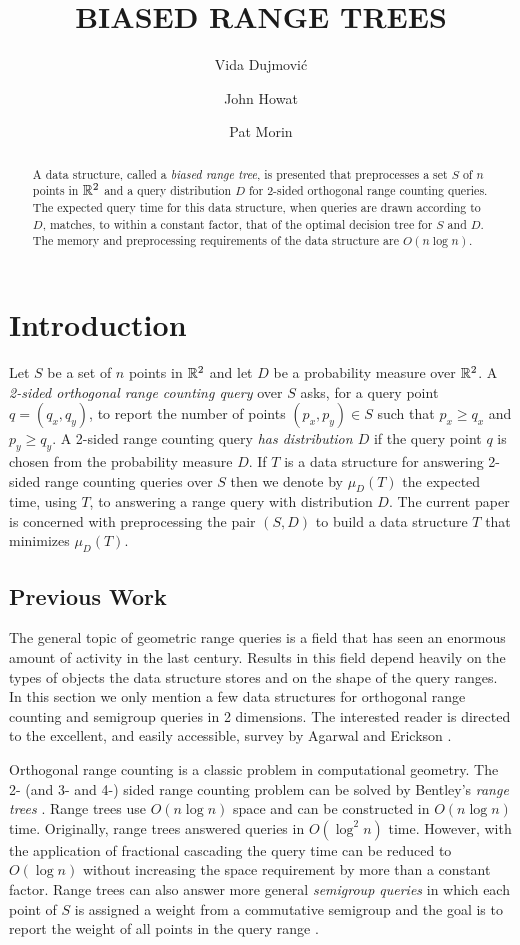\documentclass[lotsofwhite,charterfonts]{patmorin}
\title{\MakeUppercase{Biased Range Trees}}
\author{Vida Dujmovi\'c
	\and John Howat
	\and Pat Morin}
\begin{document}
\maketitle
\begin{abstract}
A data structure, called a \emph{biased range tree}, is presented that
preprocesses a set $S$ of $n$ points in $\mathbb{R}^2$ and a query
distribution $D$ for 2-sided orthogonal range counting queries.  The
expected query time for this data structure, when queries are drawn
according to $D$, matches, to within a constant factor, that of the
optimal decision tree for $S$ and $D$.   The memory and preprocessing
requirements of the data structure are $O(n\log n)$.
\end{abstract}

\section{Introduction}

Let $S$ be a set of $n$ points in $\mathbb{R}^2$ and let $D$ be a probability
measure over $\mathbb{R}^2$.  A \emph{2-sided orthogonal range counting query}
over $S$ asks, for a query point $q=(q_x,q_y)$, to report the number
of points $(p_x,p_y)\in S$ such that $p_x \ge q_x$ and $p_y \ge q_y$.
A 2-sided range counting query \emph{has distribution $D$} if the
query point $q$ is chosen from the probability measure $D$.  If $T$ is
a data structure for answering 2-sided range counting queries over $S$
then we denote by $\mu_D(T)$ the expected time, using $T$, to
answering a range query with distribution $D$.  The current paper is
concerned with preprocessing the pair $(S,D)$ to build a data
structure $T$ that minimizes $\mu_D(T)$.

\subsection{Previous Work}

The general topic of geometric range queries is a field that has seen
an enormous amount of activity in the last century.  Results in this
field depend heavily on the types of objects the data structure stores
and on the shape of the query ranges.  In this section we only mention
a few data structures for orthogonal range counting and semigroup
queries in 2 dimensions.  The interested reader is directed to the
excellent, and easily accessible, survey by Agarwal and Erickson
\cite{ea99}.

Orthogonal range counting is a classic problem in computational
geometry.  The 2- (and 3- and 4-) sided range counting problem can be
solved by Bentley's \emph{range trees} \cite{ae42}.  Range trees use
$O(n\log n)$ space and can be constructed in $O(n\log n)$ time.
Originally, range trees answered queries in $O(\log^2 n)$ time.
However, with the application of fractional cascading
\cite{ae76,ae196} the query time can be reduced to $O(\log n)$ without
increasing the space requirement by more than a constant factor.
Range trees can also answer more general \emph{semigroup queries} in
which each point of $S$ is assigned a weight from a commutative
semigroup and the goal is to report the weight of all points in the
query range \cite{ae133,ae292}.
\end{document}
